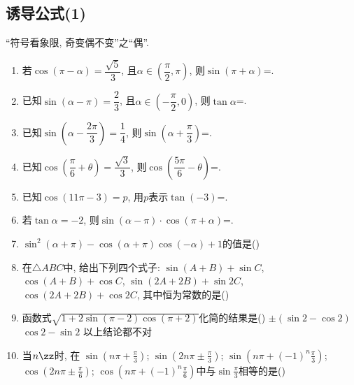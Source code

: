 \subsection{诱导公式(1)}
\zsd ``符号看象限, 奇变偶不变''之``偶''.

\begin{enumerate}
\item 若$\cos(\pi-\alpha)=\dfrac{\sqrt5}{3}$, 且$\alpha\in\left(\dfrac{\pi}{2},\pi\right)$, 则$\sin(\pi+\alpha)$=. 

\item 已知$\sin(\alpha-\pi)=\dfrac{2}{3}$, 且$\alpha\in\left(-\dfrac{\pi}{2},0\right)$, 则$\tan\alpha$=. 

\item 已知$\sin\left(\alpha-\dfrac{2\pi}{3}\right)=\dfrac{1}{4}$, 则$\sin\left(\alpha+\dfrac{\pi}{3}\right)$=. 


\item 已知$\cos\left(\dfrac{\pi}{6}+\theta\right)=\dfrac{\sqrt{3}}{3}$, 则$\cos\left(\dfrac{5\pi}{6}-\theta\right)$=. 

\item 已知$\cos(11\pi-3)=p$, 用$p$表示$\tan(-3)$=.  

\item 若$\tan\alpha=-2$, 则$\sin(\alpha-\pi)\cdot\cos(\pi+\alpha)$=. 

\item $\sin^2(\alpha+\pi)-\cos(\alpha+\pi)\cos(-\alpha)+1$的值是\dotfill()

\item 在$\triangle{ABC}$中, 给出下列四个式子: 
 $\sin(A+B)+\sin{C}$, 
 $\cos(A+B)+\cos{C}$, 
 $\sin(2A+2B)+\sin2C$, 
 $\cos(2A+2B)+\cos2C$, 其中恒为常数的是\dotfill()


\item 函数式$\sqrt{1+2\sin(\pi-2)\cos(\pi+2)}$化简的结果是\dotfill()
{$\pm(\sin2-\cos2)$}
{$\cos2-\sin2$}
{以上结论都不对}

\item 当$n\zz$时, 在
 $\sin(n\pi+\frac{\pi}{3})$; 
 $\sin(2n\pi\pm\frac{\pi}{3})$; 
 $\sin(n\pi+(-1)^n\frac{\pi}{3})$; 
 $\cos(2n\pi\pm\frac{\pi}{6})$; 
 $\cos(n\pi+(-1)^n\frac{\pi}{6})$中与$\sin\frac{\pi}{3}$相等的是\dotfill()
{}
{}
{}



\end{enumerate}

